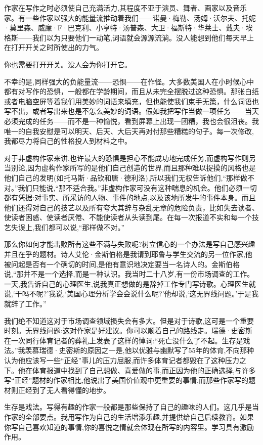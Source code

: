 作家在写作之时必须使自己充满活力,其程度不亚于演员、舞者、画家以及音乐家。有一些作家以强大的能量流推动着我们——诺曼·梅勒、汤姆·沃尔夫、托妮·莫里森、威廉·F·巴克利、小亨特·汤普森、大卫·福斯特·华莱士、戴夫·埃格斯——我们以为只要他们一动笔,词语就会源源流淌。没人能想到他们每天早上在打开开关之时所使出的力气。

你也需要打开开关。没人会为你打开它。

不幸的是,同样强大的负能量流——恐惧——在作怪。大多数美国人在小时候心中都有对写作的恐惧，一般都在学龄期间，而且从未完全摆脱过这种恐惧。那张白纸或者电脑空屏等着我们用美妙的词语来填充，但也能使我们束手无策，什么词语也写不出，或者写出来也是不怎么美妙的词语。假如我把写作当做一项任务——当天必须完成的任务——而不是一种愉悦，看到屏幕上出现一团糟，我也会很沮丧。我唯一的自我安慰是可以明天、后天、大后天再对付那些糟糕的句子。每一次修改,我都尽力将自己的性格投人到材料之中。

对于非虚构作家来讲,也许最大的恐惧是担心不能成功地完成任务,而虚构写作则另当别论,因为虚构作家所写的是他们自己创造的世界,而且那种难以捉摸的风格也是他们自己的发明(如托马斯·品钦和唐·德利洛),所以我们无权告诉他们,“那样做不对。”我们只能说,“那不适合我。”非虚构作家可没有这种喘息的机会。他们必须一切都有凭据:对事实、所采访的人物、事件的地点,以及该地所发牛的事件本身。而且他们还得对自己的技艺以及所有夸大其辞与杂乱无章的危险负责，比如失去读者、使读者困惑、使读者厌倦、不能使读者从头读到尾。在每一次报道不实和每一个技艺失误上,我们都可以说,“那样做不对。”

那么你如何才能击败所有这些不满与失败呢?树立信心的一个办法是写自己感兴趣并且在乎的题材。诗人艾伦·金斯伯格是我请到耶鲁与学生交流的另一位作家,他被问起是否有一个确切的时间,是他有意识地决定要当一名诗人的。金斯伯格说,“那并不是一个选择,而是一种认识。我当时二十八岁,有一份市场调查的工作。一天,我告诉自己的心理医生,说我真正想做的是辞掉工作专门写诗歌。心理医生就说,‘干吗不呢?’我说,‘美国心理分析学会会说什么呢?’他却说,‘这无界线问题。’于是我就辞了工作。”

我们绝不知道这对于市场调查领域损失会有多大。但是对于诗歌,这可是一个重要时刻。无界线问题:这对作家是好建议。你可以顺着自己的路线走。瑞德·史密斯在一次同行体育记者的葬礼上发表了这样的悼词:“死亡没什么了不起。生存是戏法。”我羡慕瑞德·史密斯的原因之一是,他以优雅与幽默写了55年的体育,不向那种认为他应该写一些“正经”事儿的压力屈服,而许多体育记者都毁在了这种压力之下。他在体育报道中找到了自己想做、喜爱做的事,而正因为他的正确选择,与许多写“正经”题材的作家相比,他说出了美国价值观中更重要的事情,而那些作家写的题材则正经到了无人看得懂的地步。

生存是戏法。写得有趣的作家一般都是那些保持了自己的趣味的人们。这几乎是当作家的全部要点。我用写作为自己的生活增添乐趣,并提供给自己后续教育。如果你写自己喜欢知道的事情,你的喜悦之情就会体现在所写的内容里。学习具有激励作用。

